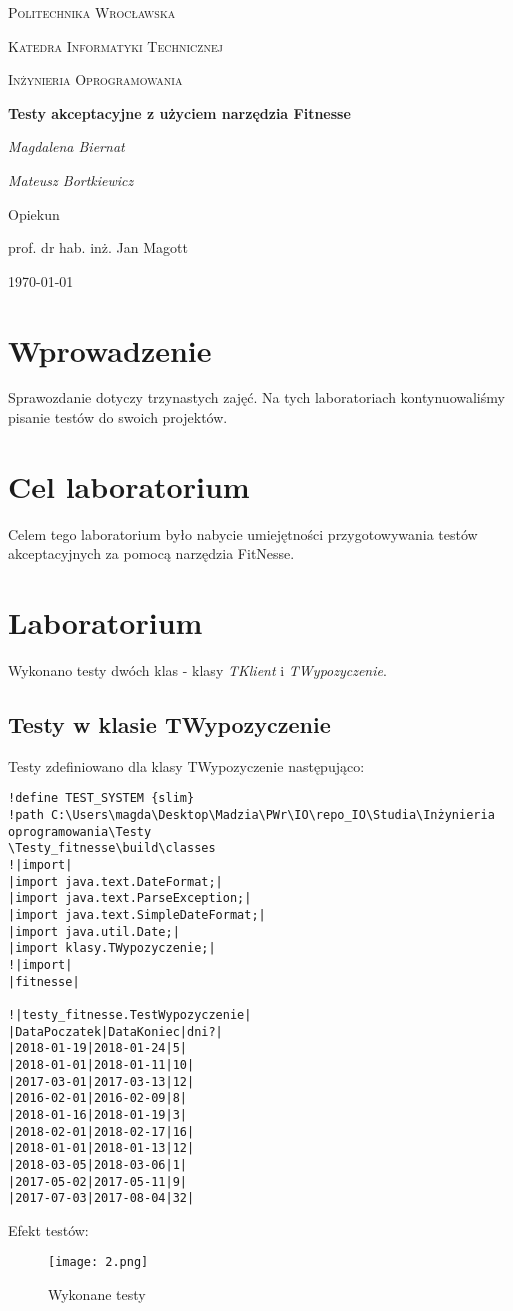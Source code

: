 \documentclass{article}
\begin{document}
	
	\begin{titlepage}
		\centering
		{\scshape\LARGE Politechnika Wrocławska \par}
		{\scshape\Large Katedra Informatyki Technicznej\par}
		
		\vspace{1cm}
		{\scshape\Large Inżynieria Oprogramowania\par}
		\vspace{1.5cm}
		{\huge\bfseries Testy akceptacyjne z użyciem narzędzia Fitnesse\par}
		\vspace{2cm}
		{\Large\itshape Magdalena Biernat\par}
		{\Large\itshape Mateusz Bortkiewicz\par}
		\vfill
		Opiekun\par
		prof. dr hab. inż. Jan Magott 
		
		\vfill
		{\large \today\par}
	\end{titlepage}
	\newpage
	\section{Wprowadzenie}
	Sprawozdanie dotyczy trzynastych zajęć. Na tych laboratoriach kontynuowaliśmy pisanie testów do swoich projektów.
	
	\section{Cel laboratorium}
Celem tego laboratorium było nabycie umiejętności przygotowywania testów akceptacyjnych za pomocą narzędzia FitNesse.
\section{Laboratorium}
Wykonano testy dwóch klas - klasy \textit{TKlient} i \textit{TWypozyczenie}.
\subsection{Testy w klasie TWypozyczenie}
Testy zdefiniowano dla klasy TWypozyczenie następująco:
\begin{verbatim}
!define TEST_SYSTEM {slim}
!path C:\Users\magda\Desktop\Madzia\PWr\IO\repo_IO\Studia\Inżynieria oprogramowania\Testy
\Testy_fitnesse\build\classes
!|import|
|import java.text.DateFormat;|
|import java.text.ParseException;|
|import java.text.SimpleDateFormat;|
|import java.util.Date;|
|import klasy.TWypozyczenie;|
!|import|
|fitnesse|

!|testy_fitnesse.TestWypozyczenie|
|DataPoczatek|DataKoniec|dni?|
|2018-01-19|2018-01-24|5|
|2018-01-01|2018-01-11|10|
|2017-03-01|2017-03-13|12|
|2016-02-01|2016-02-09|8|
|2018-01-16|2018-01-19|3|
|2018-02-01|2018-02-17|16|
|2018-01-01|2018-01-13|12|
|2018-03-05|2018-03-06|1|
|2017-05-02|2017-05-11|9|
|2017-07-03|2017-08-04|32|
\end{verbatim}
\newpage
Efekt testów:
	\begin{figure}[!ht]
	\centering
	\texttt{[image: 2.png]}
	\caption{Wykonane testy}
	\label{fig:obrazek 1}
	\newpage
\end{figure}
\end{document}
